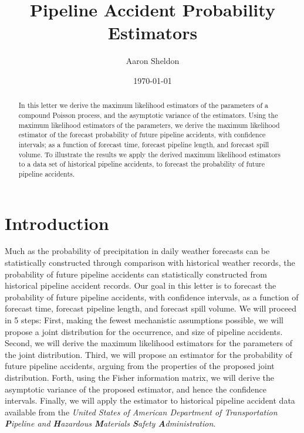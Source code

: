 \documentclass[letterpaper,10pt,oneside,final,onecolumn]{article}
\author{Aaron Sheldon}
\title{Pipeline Accident Probability Estimators}
\date{\today}
\begin{document}
	\maketitle
	\begin{abstract}
		In this letter we derive the maximum likelihood estimators of the parameters of a compound Poisson process, and the asymptotic variance of the estimators.
		Using the maximum likelihood estimators of the parameters, we derive the maximum likelihood estimator of the forecast probability of future pipeline accidents, with confidence intervals; as a function of forecast time, forecast pipeline length, and forecast spill volume.
		To illustrate the results we apply the derived maximum likelihood estimators to a data set of historical pipeline accidents, to forecast the probability of future pipeline accidents. 
	\end{abstract}

	\section{Introduction}\label{introduction}
	Much as the probability of precipitation in daily weather forecasts can be statistically constructed through comparison with historical weather records, the probability of future pipeline accidents can statistically constructed from historical pipeline accident records.
	Our goal in this letter is to forecast the probability of future pipeline accidents, with confidence intervals, as a function of forecast time, forecast pipeline length, and forecast spill volume.
	We will proceed in 5 steps:
	First, making the fewest mechanistic assumptions possible, we will propose a joint distribution for the occurrence, and size of pipeline accidents.
	Second, we will derive the maximum likelihood estimators for the parameters of the joint distribution.
	Third, we will propose an estimator for the probability of future pipeline accidents, arguing from the properties of the proposed joint distribution.
	Forth, using the Fisher information matrix, we will derive the asymptotic variance of the proposed estimator, and hence the confidence intervals.
	Finally, we will apply the estimator to historical pipeline accident data available from the \textit{United States of American Department of Transportation \textbf{P}ipeline and \textbf{H}azardous \textbf{M}aterials \textbf{S}afety \textbf{A}dministration}.
\end{document}
